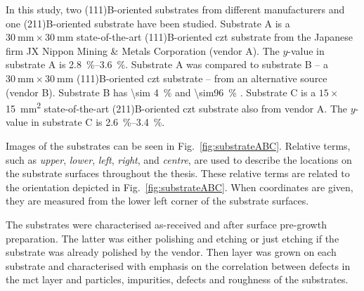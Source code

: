 In this study, two (111)B-oriented substrates from different manufacturers and one (211)B-oriented substrate have been studied. Substrate A is a $\SI{30}{\milli\metre}\times\SI{30}{\milli\metre}$ state-of-the-art (111)B-oriented \ac{czt} substrate from the Japanese firm JX Nippon Mining \& Metals Corporation (vendor A). The $y$-value in substrate A is \SIrange{2.8}{3.6}{\percent}. Substrate A was compared to substrate B -- a $\SI{30}{\milli\metre}\times\SI{30}{\milli\metre}$ (111)B-oriented \ac{czt} substrate -- from an alternative source (vendor B). Substrate B has \SI{\sim 4}{\percent}  and \SI{\sim96}{\percent} . Substrate C is a $15\times$\SI{15}{\milli\metre^2} state-of-the-art (211)B-oriented \ac{czt} substrate also from vendor A. The $y$-value in substrate C is \SIrange{2.6}{3.4}{\percent}. %

Images of the substrates can be seen in Fig.~\ref{fig:substrateABC}. Relative terms, such as \emph{upper}, \emph{lower}, \emph{left}, \emph{right}, and \emph{centre}, are used to describe the locations on the substrate surfaces throughout the thesis. These relative terms are related to the orientation depicted in Fig.~\ref{fig:substrateABC}. When coordinates are given, they are measured from the lower left corner of the substrate surfaces. %

The substrates were characterised as-received and after surface pre-growth preparation. The latter was either polishing and etching or just etching if the substrate was already polished by the vendor. Then  layer was grown on each substrate and characterised with emphasis on the correlation between defects in the \ac{mct} layer and particles, impurities, defects and roughness of the substrates.

